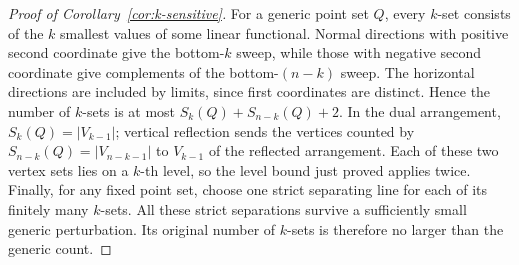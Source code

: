 \begin{proof}[Proof of Corollary~\ref{cor:k-sensitive}]
For a generic point set $Q$, every $k$-set consists of the $k$ smallest
values of some linear functional. Normal directions with positive
second coordinate give the bottom-$k$ sweep, while those with negative
second coordinate give complements of the bottom-$(n-k)$ sweep.
The horizontal directions are included by limits, since first
coordinates are distinct. Hence the number of $k$-sets is at most
$S_k(Q)+S_{n-k}(Q)+2$. In the dual arrangement,
$S_k(Q)=|V_{k-1}|$; vertical reflection sends the vertices counted by
$S_{n-k}(Q)=|V_{n-k-1}|$ to $V_{k-1}$ of the reflected arrangement.
Each of these two vertex sets
lies on a $k$-th level, so the level bound just proved applies twice.
Finally, for any fixed point set, choose one strict separating line for
each of its finitely many $k$-sets. All these strict separations survive
a sufficiently small generic perturbation. Its original number of
$k$-sets is therefore no larger than the generic count.
\end{proof}
